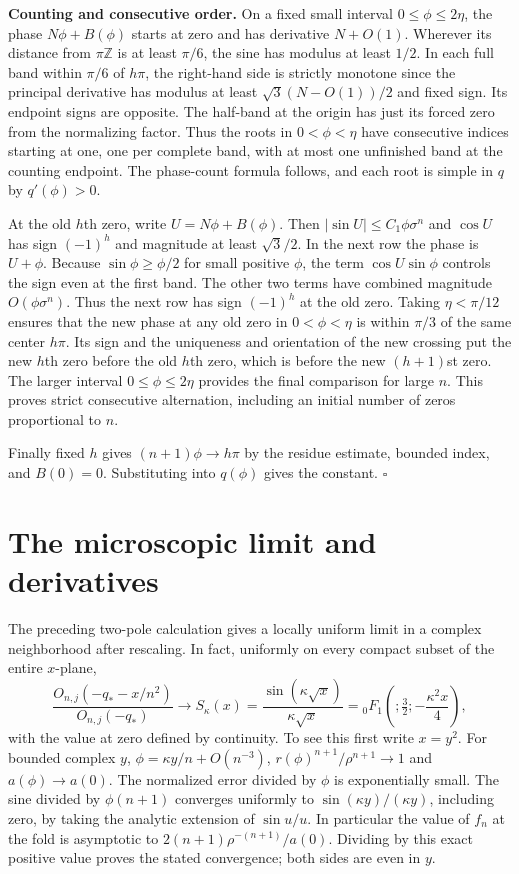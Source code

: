 \documentclass[11pt]{article}
\begin{document}
\textbf{Counting and consecutive order.} On a fixed small interval $0\le\phi\le2\eta$, the phase $N\phi+B(\phi)$ starts at zero and has derivative $N+O(1)$. Wherever its distance from $\pi\mathbb Z$ is at least $\pi/6$, the sine has modulus at least $1/2$. In each full band within $\pi/6$ of $h\pi$, the right-hand side is strictly monotone since the principal derivative has modulus at least $\sqrt3(N-O(1))/2$ and fixed sign. Its endpoint signs are opposite. The half-band at the origin has just its forced zero from the normalizing factor. Thus the roots in $0<\phi<\eta$ have consecutive indices starting at one, one per complete band, with at most one unfinished band at the counting endpoint. The phase-count formula follows, and each root is simple in $q$ by $q'(\phi)>0$.

At the old $h$th zero, write $U=N\phi+B(\phi)$. Then $|\sin U|\le C_1\phi\sigma^n$ and $\cos U$ has sign $(-1)^h$ and magnitude at least $\sqrt3/2$. In the next row the phase is $U+\phi$. Because $\sin\phi\ge\phi/2$ for small positive $\phi$, the term $\cos U\sin\phi$ controls the sign even at the first band. The other two terms have combined magnitude $O(\phi\sigma^n)$. Thus the next row has sign $(-1)^h$ at the old zero. Taking $\eta<\pi/12$ ensures that the new phase at any old zero in $0<\phi<\eta$ is within $\pi/3$ of the same center $h\pi$. Its sign and the uniqueness and orientation of the new crossing put the new $h$th zero before the old $h$th zero, which is before the new $(h+1)$st zero. The larger interval $0\le\phi\le2\eta$ provides the final comparison for large $n$. This proves strict consecutive alternation, including an initial number of zeros proportional to $n$.

Finally fixed $h$ gives $(n+1)\phi\to h\pi$ by the residue estimate, bounded index, and $B(0)=0$. Substituting into $q(\phi)$ gives the constant. $\square$

\section{The microscopic limit and derivatives}

The preceding two-pole calculation gives a locally uniform limit in a complex neighborhood after rescaling. In fact, uniformly on every compact subset of the entire $x$-plane,
\[
\frac{O_{n,j}(-q_*-x/n^2)}{O_{n,j}(-q_*)}
 \longrightarrow S_\kappa(x)
 =\frac{\sin(\kappa\sqrt{x})}{\kappa\sqrt{x}}
 ={}_0F_1\!\left(;\tfrac32;-\frac{\kappa^2x}{4}\right),
\]
with the value at zero defined by continuity. To see this first write $x=y^2$. For bounded complex $y$, $\phi=\kappa y/n+O(n^{-3})$, $r(\phi)^{n+1}/\rho^{n+1}\to1$ and $a(\phi)\to a(0)$. The normalized error divided by $\phi$ is exponentially small. The sine divided by $\phi(n+1)$ converges uniformly to $\sin(\kappa y)/(\kappa y)$, including zero, by taking the analytic extension of $\sin u/u$. In particular the value of $f_n$ at the fold is asymptotic to $2(n+1)\rho^{-(n+1)}/a(0)$. Dividing by this exact positive value proves the stated convergence; both sides are even in $y$.
\end{document}
